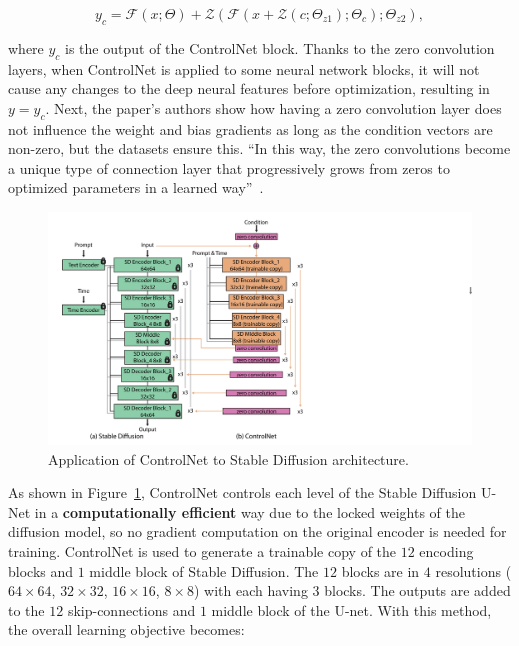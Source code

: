 \documentclass[preprint]{elsarticle}
\begin{document}
\begin{equation}
	y_c = \mathcal{F}(x;\Theta) + \mathcal{Z}(\mathcal{F}(x+\mathcal{Z}(c;\Theta_{z1});\Theta_c);\Theta_{z2}),
\end{equation}

where $y_c$ is the output of the ControlNet block. Thanks to the zero convolution layers, when ControlNet is applied to some neural network blocks,  it will not cause any changes to the deep neural features before optimization, resulting in $y=y_c$.
Next, the paper's authors show how having a zero convolution layer does not influence the weight 
and bias gradients as long as the condition vectors are non-zero, but the datasets ensure this.
``In this way, the zero convolutions become a unique type of connection layer that progressively grows from zeros to
optimized parameters in a learned way''~\cite{zhang2023adding}.

\begin{figure}[t]
	\centering
    \includegraphics[scale=0.8]{img/svg/Controlnet2.png}
	\caption{Application of ControlNet to Stable Diffusion architecture.}\label{fig:controlnet-2}
\end{figure}


As shown in Figure~\ref{fig:controlnet-2}, ControlNet controls each level of the Stable Diffusion U-Net in a \textbf{computationally efficient} way due to the locked weights of the diffusion model, so no gradient computation on the original encoder is needed for training. 
ControlNet is used to generate a trainable copy of the $12$ encoding blocks and $1$ middle block of Stable Diffusion. The $12$ blocks are in $4$ resolutions ($64 \times 64$, $32 \times 32$, $16 \times 16$, $8 \times 8$) with each having $3$ blocks. The outputs are added to the $12$ skip-connections and $1$ middle block of the U-net. With this method, the overall learning objective becomes:
\end{document}
